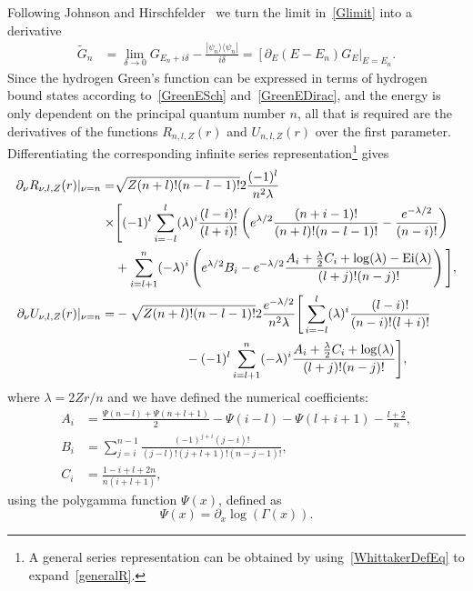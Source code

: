 Following Johnson and Hirschfelder~\cite{JandH} we turn the limit in~\eqref{Glimit} into a derivative
\begin{align}
    \tilde{G}_n &= \lim_{\delta \rightarrow 0} G_{E_n+i \delta} - \frac{|\psi_n \rangle \langle \psi_n|}{i \delta}
    = \left[\partial_E (E-E_n)G_E\right|_{E=E_n}.
    \label{Gderiv}
\end{align}
Since the hydrogen Green's function can be expressed in terms of hydrogen bound states according to~\eqref{GreenESch} and~\eqref{GreenEDirac}, and the energy is only dependent on the principal quantum number $n$, all that is required are the derivatives of the functions $R_{n,l,Z}(r)$ and $U_{n,l,Z}(r)$ over the first parameter. Differentiating the corresponding infinite series representation\footnote{A general series representation can be obtained by using~\eqref{WhittakerDefEq} to expand~\eqref{generalR}.} gives
\begin{align}
\partial_{\nu} R_{\nu,l,Z}(r)|_{\nu=n} =& \sqrt{Z(n+l)!(n-l-1)!}2\frac{(-1)^l}{n^2 \lambda} \nonumber
\\
\times&\Bigg[(-1)^l\sum_{i=-l}^l(\lambda)^i \frac{(l-i)!}{(l+i)!}\left(e^{\lambda/2}\frac{(n+i-1)!}{(n+l)!(n-l-1)!} -\frac{e^{-\lambda/2}}{(n-i)!}\right) \nonumber 
\\
&+\sum_{i=l+1}^n(-\lambda)^i\left(e^{\lambda/2} B_i- e^{-\lambda/2} \frac{A_i+\frac{\lambda}{2} C_i+\log(\lambda)-\rm{Ei}(\lambda)}{(l+j)!(n-j)!}\right)\Bigg],
\\
\partial_{\nu} U_{\nu,l,Z}(r)|_{\nu=n} =& -\sqrt{Z(n+l)!(n-l-1)!}2\frac{e^{-\lambda/2}}{n^2 \lambda}
\Bigg[\sum_{i=-l}^l(\lambda)^i \frac{(l-i)!}{(n-i)!(l+i)!} \nonumber 
\\
&\mspace{100mu}-(-1)^l\sum_{i=l+1}^n(-\lambda)^i\frac{A_i+\frac{\lambda}{2} C_i+\log(\lambda)}{(l+j)!(n-j)!}\Bigg],
\end{align}
where $\lambda=2Zr/n$ and we have defined the numerical coefficients:
\begin{align}
  A_i &=\frac{\Psi(n-l)+\Psi(n+l+1)}{2}-\Psi(i-l)-\Psi(l+i+1)-\frac{l+2}{n},
  \\
  B_i &= \sum_{j=i}^{n-1}\frac{(-1)^{j+i} (j-i)!}{(j-l)!(j+l+1)!(n-j-1)!},
  \\
  C_i &= \frac{1-i+l+2n}{n(i+l+1)},
\end{align}
using the polygamma function $\Psi(x)$, defined as
\begin{equation}
    \Psi(x) = \partial_x \log(\Gamma(x)).
\end{equation}

